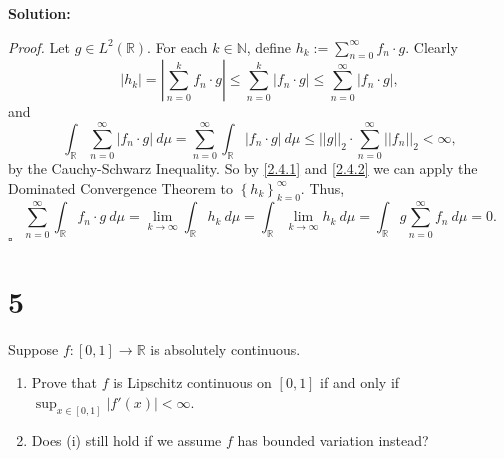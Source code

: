 \documentclass[12pt]{article}
\newcounter{ProofCounter}
\newenvironment{Proof}{\stepcounter{ProofCounter}\textit{Proof.}}{\hfill$\square$}
\begin{document}
{\bf Solution:}

\begin{Proof}
Let $g \in L^{2}(\mathbb{R})$. For each $k \in \mathbb{N}$, define $h_{k} := \sum_{n=0}^{\infty}f_{n}\cdot g$. Clearly
\begin{equation}
|h_{k}| = \left| \sum_{n=0}^{k}f_{n}\cdot g \right| \leq \sum_{n=0}^{k}|f_{n}\cdot g| \leq \sum_{n=0}^{\infty}|f_{n}\cdot g|,
\label{2.4.1}
\end{equation}
and 
\begin{equation}
\int_{\mathbb{R}} \sum_{n=0}^{\infty}|f_{n}\cdot g|\ d\mu = \sum_{n=0}^{\infty} \int_{\mathbb{R}}|f_{n}\cdot g|\ d\mu \leq ||g||_{2}\cdot
\sum_{n=0}^{\infty}||f_{n}||_{2} < \infty,
\label{2.4.2}
\end{equation}
by the Cauchy-Schwarz Inequality. So by \eqref{2.4.1} and \eqref{2.4.2} we can apply the Dominated Convergence Theorem to $\left\{ h_{k}
\right\}_{k=0}^{\infty}$. Thus,
\[ \sum_{n=0}^{\infty} \int_{\mathbb{R}} f_{n}\cdot g\ d\mu = \lim_{k\rightarrow \infty} \int_{\mathbb{R}} h_{k}\ d\mu =
\int_{\mathbb{R}}\lim_{k\rightarrow\infty} h_{k}\ d\mu = \int_{\mathbb{R}}g\sum_{n=0}^{\infty} f_{n} \ d\mu = 0. \]
\end{Proof}

\section*{5}
Suppose $f : [0,1] \rightarrow \mathbb{R}$ is absolutely continuous.
\begin{enumerate}[label=(\roman*)]
\item Prove that $f$ is Lipschitz continuous on $[0,1]$ if and only if $\sup_{x \in [0,1]}|f'(x)| < \infty$.
\item Does (i) still hold if we assume $f$ has bounded variation instead?
\end{enumerate}
\end{document}
